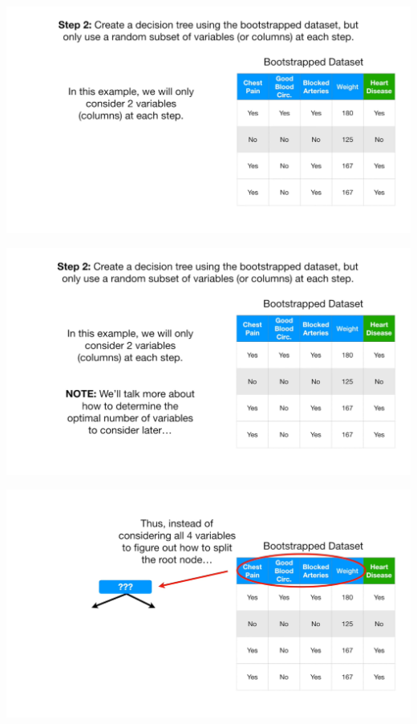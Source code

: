 \documentclass[
  ignorenonframetext,
]{beamer}
\begin{document}
\begin{frame}{}
\protect\hypertarget{section-23}{}
\includegraphics{images/r24.png}
\end{frame}

\begin{frame}{}
\protect\hypertarget{section-24}{}
\includegraphics{images/r25.png}
\end{frame}

\begin{frame}{}
\protect\hypertarget{section-25}{}
\includegraphics{images/r26.png}
\end{frame}
\end{document}
